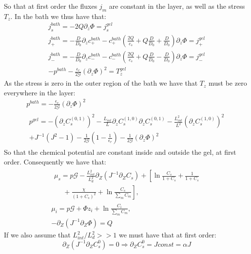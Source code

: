 So that at first order the fluxes $j_m$ are constant in the layer, as well as the stress $T_z$. In the bath we thus have that:
\begin{gather}
j^{bath}_s = - 2Q \partial_z \Phi= j^{gel}_s \\
j^{bath}_+ = - \frac{D}{D_0} \partial_z c^{bath}_+ - c^{bath}_+\left(\frac{2Q}{c_s}+Q\frac{D}{D_0}+\frac{D}{D_0}\right)\partial_z \Phi= j^{gel}_+ \\
j^{bath}_- = - \frac{D}{D_0} \partial_z c^{bath}_- - c^{bath}_-\left(\frac{2Q}{c_s}+Q\frac{D}{D_0}-\frac{D}{D_0}\right)\partial_z \Phi = j^{gel}_-\\
-p^{bath}-\frac{\epsilon_r}{2\mathcal{G}}(\partial_z \Phi)^2=T^{gel}_z\label{sub3}
\end{gather}
As the stress is zero in the outer region of the bath we have that $T_z$ must be zero everywhere in the layer:
\begin{gather}
p^{bath}= -\frac{\epsilon_r}{2\mathcal{G}} (\partial_z \Phi)^2 \\
\begin{aligned}
p^{gel}=-(\partial_z C^{(0,1)}_s)^2-\frac{L_{int}}{L}\partial_{z} C^{(1,0)}_s\partial_{z} C^{(0,1)}_s-\frac{L_{int}^2}{L^2}(\partial_{z} C^{(1,0)}_s)^2 \\+ J^{-1}(J^2-1) -\frac{1}{2\mathcal{G}} \left(1-\frac{1}{\epsilon_r}\right)-\frac{1}{2\mathcal{G}} (\partial_z \Phi)^2
\end{aligned}
\end{gather}
So that the chemical potential are constant inside and outside the gel, at first order. Consequently we have that:
\begin{gather}
\begin{aligned}
\mu_s = p \mathcal{G} - \frac{L^2_{int}}{L_d^2}  \partial_Z (J^{-1} \partial_Z C_s) + \left[\ln \frac{C_s}{1+C_s} + \frac{1}{1+C_s}\right.\\
\left.\ \ \ \ \ \ +\frac{\chi}{(1+C_s)^2} + \ln \frac{C_s}{\sum_m C_m} \right], 
\end{aligned}\\[2.5mm]
\mu_i = p \mathcal{G}+ \Phi z_i + \ln \frac{C_i}{\sum_m C_m} ,\\
- \partial_Z (J^{-1}\partial_Z\Phi) = Q\, 
\end{gather}
If we also assume that $L_{int}^2/L^2_d>>1$ we must have that at first order:
\begin{equation}
\partial_Z(J^{-1}\partial_ZC^0_s)=0 \Rightarrow \partial_Z C^0_s = J const = \alpha J 
\end{equation}
